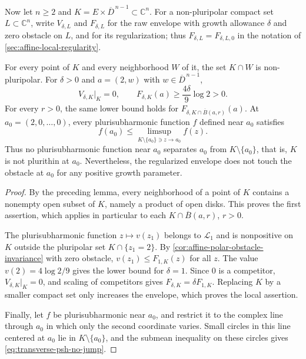 Now let $n\geq2$ and $K=E\times\overline D^{\,n-1}\subset\mathbb C^n$. For a non-pluripolar compact set $L\subset\mathbb C^n$, write $V_{\delta,L}$ and $F_{\delta,L}$ for the raw envelope with growth allowance $\delta$ and zero obstacle on $L$, and for its regularization; thus $F_{\delta,L}=F_{\delta,L,0}$ in the notation of \cref{sec:affine-local-regularity}.

\begin{proposition}\label{prop:affine-transverse-contact-defect}
For every point of $K$ and every neighborhood $W$ of it, the set $K\cap W$ is non-pluripolar. For $\delta>0$ and $a=(2,w)$ with $w\in\overline D^{\,n-1}$,
\begin{equation}\label{eq:affine-contact-defect}
 V_{\delta,K}|_K=0,\qquad
 F_{\delta,K}(a)\geq\frac{4\delta}{9}\log2>0.
\end{equation}
For every $r>0$, the same lower bound holds for $F_{\delta,K\cap\overline B(a,r)}(a)$. At $a_0=(2,0,\ldots,0)$, every plurisubharmonic function $f$ defined near $a_0$ satisfies
\begin{equation}\label{eq:transverse-psh-no-jump}
 f(a_0)\leq\limsup_{K\setminus\{a_0\}\ni z\to a_0}f(z).
\end{equation}
Thus no plurisubharmonic function near $a_0$ separates $a_0$ from $K\setminus\{a_0\}$, that is, $K$ is not plurithin at $a_0$. Nevertheless, the regularized envelope does not touch the obstacle at $a_0$ for any positive growth parameter.
\end{proposition}
\begin{proof}
By the preceding lemma, every neighborhood of a point of $K$ contains a nonempty open subset of $K$, namely a product of open disks. This proves the first assertion, which applies in particular to each $K\cap\overline B(a,r)$, $r>0$.

The plurisubharmonic function $z\mapsto v(z_1)$ belongs to $\mathcal L_1$ and is nonpositive on $K$ outside the pluripolar set $K\cap\{z_1=2\}$. By \cref{cor:affine-polar-obstacle-invariance} with zero obstacle, $v(z_1)\leq F_{1,K}(z)$ for all $z$. The value $v(2)=4\log2/9$ gives the lower bound for $\delta=1$. Since $0$ is a competitor, $V_{\delta,K}|_K=0$, and scaling of competitors gives $F_{\delta,K}=\delta F_{1,K}$. Replacing $K$ by a smaller compact set only increases the envelope, which proves the local assertion.

Finally, let $f$ be plurisubharmonic near $a_0$, and restrict it to the complex line through $a_0$ in which only the second coordinate varies. Small circles in this line centered at $a_0$ lie in $K\setminus\{a_0\}$, and the submean inequality on these circles gives \eqref{eq:transverse-psh-no-jump}.
\end{proof}
